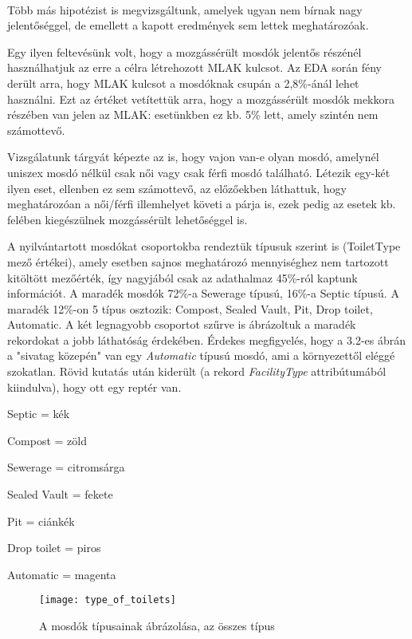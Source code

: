 	\paragraph{}
	Több más hipotézist is megvizsgáltunk, amelyek ugyan nem bírnak nagy jelentőséggel, de emellett a kapott eredmények sem lettek meghatározóak.\par
	Egy ilyen feltevésünk volt, hogy a mozgássérült mosdók jelentős részénél használhatjuk az erre a célra létrehozott MLAK kulcsot. Az EDA során fény derült arra, hogy MLAK kulcsot a mosdóknak csupán a 2,8\%-ánál lehet használni. Ezt az értéket vetítettük arra, hogy a mozgássérült mosdók mekkora részében van jelen az MLAK: esetünkben ez kb. 5\% lett, amely szintén nem számottevő.\par
	Vizsgálatunk tárgyát képezte az is, hogy vajon van-e olyan mosdó, amelynél uniszex mosdó nélkül csak női vagy csak férfi mosdó található. Létezik egy-két ilyen eset, ellenben ez sem számottevő, az előzőekben láthattuk, hogy meghatározóan a női/férfi illemhelyet követi a párja is, ezek pedig az esetek kb. felében kiegészülnek mozgássérült lehetőséggel is.\par
	A nyilvántartott mosdókat csoportokba rendeztük típusuk szerint is (ToiletType mező értékei), amely esetben sajnos meghatározó mennyiséghez nem tartozott kitöltött mezőérték, így nagyjából csak az adathalmaz 45\%-ról kaptunk információt. A maradék mosdók 72\%-a Sewerage típusú, 16\%-a Septic típusú. A maradék 12\%-on 5 típus osztozik: Compost, Sealed Vault, Pit, Drop toilet, Automatic. A két legnagyobb csoportot  szűrve is ábrázoltuk a maradék rekordokat a jobb láthatóság érdekében. Érdekes megfigyelés, hogy a 3.2-es ábrán a "sivatag közepén" van egy \textit{Automatic} típusú mosdó, ami a környezettől eléggé szokatlan. Rövid kutatás után kiderült (a rekord \textit{FacilityType} attribútumából kiindulva), hogy ott egy reptér van.
	\begin{compactlist}
		\item Septic = kék
		\item Compost = zöld
		\item Sewerage = citromsárga
		\item Sealed Vault = fekete
		\item Pit = ciánkék
		\item Drop toilet = piros
		\item Automatic = magenta
	\end{compactlist}\par
	\begin{figure}[!ht]
		\centering	
			\texttt{[image: type\_of\_toilets]}
			\caption{A mosdók típusainak ábrázolása, az összes típus}
	\end{figure}
